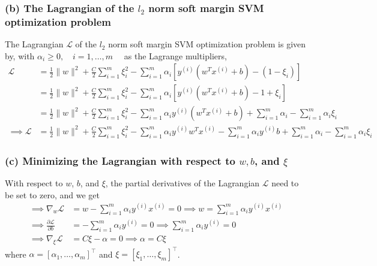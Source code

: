 \subsubsection*{(b) The Lagrangian of the \( l_{2} \) norm soft margin SVM optimization problem}

The Lagrangian \( \mathcal{L} \) of the \( l_{2} \) norm soft margin SVM optimization problem is given by, with \( \alpha_{i} \geq 0, \quad i = 1, \ldots, m \quad \) as the Lagrange multipliers,
\begin{align*}
    \mathcal{L}
     & =
    \frac{1}{2}\|w\|^{2}+\frac{C}{2} \sum_{i=1}^{m} \xi_{i}^{2}
    - \sum_{i=1}^{m} \alpha_{i} \left[ y^{(i)}\left(w^{T} x^{(i)}+b\right) - (1-\xi_{i}) \right]
    \\ & =
    \frac{1}{2}\|w\|^{2}+\frac{C}{2} \sum_{i=1}^{m} \xi_{i}^{2}
    - \sum_{i=1}^{m} \alpha_{i} \left[ y^{(i)}\left(w^{T} x^{(i)}+b\right) - 1 + \xi_{i} \right]
    \\ & =
    \frac{1}{2}\|w\|^{2}+\frac{C}{2} \sum_{i=1}^{m} \xi_{i}^{2}
    - \sum_{i=1}^{m} \alpha_{i} y^{(i)} \left(w^{T} x^{(i)}+b\right)
    + \sum_{i=1}^{m} \alpha_{i} - \sum_{i=1}^{m} \alpha_{i} \xi_{i}
    \\
    \implies
    \mathcal{L}
     & =
    \frac{1}{2} \|w\|^{2}
    + \frac{C}{2} \sum_{i=1}^{m} \xi_{i}^{2}
    - \sum_{i=1}^{m} \alpha_{i} y^{(i)} w^{T} x^{(i)}
    - \sum_{i=1}^{m} \alpha_{i} y^{(i)} b
    + \sum_{i=1}^{m} \alpha_{i}
    - \sum_{i=1}^{m} \alpha_{i} \xi_{i}
\end{align*}

\subsubsection*{(c) Minimizing the Lagrangian with respect to \( w, b \), and \( \xi \)}

With respect to \( w \), \( b \), and \( \xi \), the partial derivatives of the Lagrangian \( \mathcal{L} \) need to be set to zero, and we get
\begin{align*}
    \implies
    \nabla_{w} \mathcal{L}
     & =
    w - \sum_{i=1}^{m} \alpha_{i} y^{(i)} x^{(i)}
    = 0
    \implies w = \sum_{i=1}^{m} \alpha_{i} y^{(i)} x^{(i)}
    \\
    \implies
    \frac{\partial \mathcal{L}}{\partial b}
     & =
    - \sum_{i=1}^{m} \alpha_{i} y^{(i)}
    = 0
    \implies \sum_{i=1}^{m} \alpha_{i} y^{(i)} = 0
    \\
    \implies
    \nabla_{\xi} \mathcal{L}
     & =
    C \xi - \alpha
    = 0
    \implies \alpha = C \xi
\end{align*}
where \( \alpha = {\left[ \alpha_{1}, \ldots, \alpha_{m} \right]}^\top \) and \( \xi = {\left[ \xi_{1}, \ldots, \xi_{m} \right]}^\top \).

